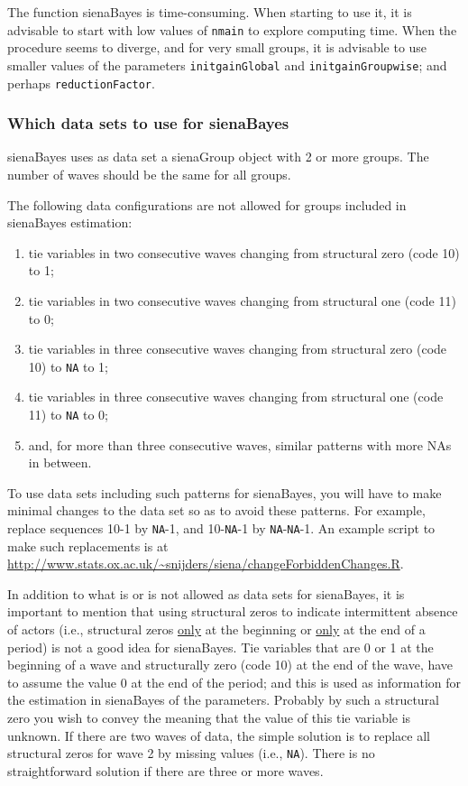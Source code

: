 \documentclass[a4paper,fleqn,11pt]{article}
\newcommand{\+}{\, + \,}
\newcommand{\sfn}[1]{\textsf{#1}}
\begin{document}
  The function \sfn{sienaBayes} is time-consuming. When starting to use it, it is advisable
  to start with low values of \texttt{nmain} to explore computing time.
  When the procedure seems to diverge, and for very small groups, it is
  advisable to use smaller values of the parameters \texttt{initgainGlobal}
  and \texttt{initgainGroupwise}; and perhaps \texttt{reductionFactor}.


\subsubsection{Which data sets to use for sienaBayes}
\label{S_sBData}

\sfn{sienaBayes} uses as data set a \sfn{sienaGroup} object with 2 or more groups.
The number of waves should be the same for all groups.

The following data configurations are not allowed for groups
included in \sfn{sienaBayes} estimation:
\begin{enumerate}
\item tie variables in two consecutive waves changing from
    structural zero (code 10) to 1;
\item tie variables in two consecutive waves changing from
    structural one (code 11) to 0;
\item tie variables in three consecutive waves changing from
    structural zero (code 10) to \texttt{NA} to 1;
\item tie variables in three consecutive waves changing from
    structural one (code 11) to \texttt{NA} to 0;
\item and, for more than three consecutive waves, similar patterns
    with more NAs in between.
\end{enumerate}
To use data sets including such patterns for \sfn{sienaBayes},
you will have to make minimal changes to the data set
so as to avoid these patterns.
For example, replace sequences 10-1 by \texttt{NA}-1,
and 10-\texttt{NA}-1 by \texttt{NA}-\texttt{NA}-1.
An example script to make such replacements is at
{\small{\url{http://www.stats.ox.ac.uk/~snijders/siena/changeForbiddenChanges.R}}}.

In addition to what is or is not allowed as data sets for \sfn{sienaBayes},
it is important to mention that using structural zeros to indicate
intermittent absence of actors (i.e., structural zeros \underline{only} at the beginning
or  \underline{only} at the end of a period) is not a good idea
for \sfn{sienaBayes}.
Tie variables that are 0 or 1 at the beginning of a wave and
structurally zero (code 10) at the end of the wave, have to assume
the value 0 at the end of the period; and this is used as information
for the estimation in \sfn{sienaBayes} of the parameters.
Probably by such a structural zero you wish to convey the meaning that the value
of this tie variable is unknown.
If there are two waves of data, the simple solution is to replace
all structural zeros for wave 2 by missing values (i.e., \texttt{NA}).
There is no straightforward solution if there are three or more waves.
\medskip
\end{document}
